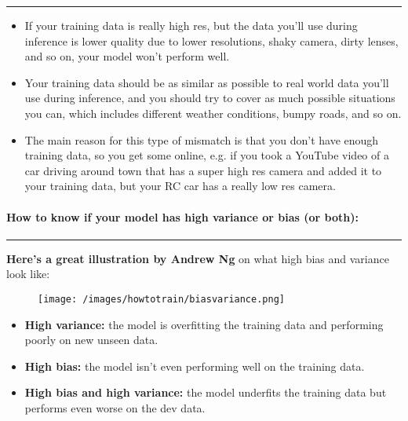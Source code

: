 \documentclass[
]{article}
\begin{document}
\begin{center}\rule{0.5\linewidth}{0.5pt}\end{center}

\begin{itemize}
\item
  If your training data is really high res, but the data you'll use
  during inference is lower quality due to lower resolutions, shaky
  camera, dirty lenses, and so on, your model won't perform well.
\item
  Your training data should be as similar as possible to real world data
  you'll use during inference, and you should try to cover as much
  possible situations you can, which includes different weather
  conditions, bumpy roads, and so on.
\item
  The main reason for this type of mismatch is that you don't have
  enough training data, so you get some online, e.g. if you took a
  YouTube video of a car driving around town that has a super high res
  camera and added it to your training data, but your RC car has a
  really low res camera.
\end{itemize}

\hypertarget{header-n36}{%
\paragraph{\texorpdfstring{\textbf{How to know if your model has high
variance or bias (or
both):}}{How to know if your model has high variance or bias (or both):}}\label{header-n36}}

\begin{center}\rule{0.5\linewidth}{0.5pt}\end{center}

\textbf{Here's a great illustration by Andrew Ng} on what high bias and
variance look like:

\begin{figure}
\centering
\texttt{[image: /images/howtotrain/biasvariance.png]}
\caption{}
\end{figure}

\begin{itemize}
\item
  \textbf{High variance:} the model is overfitting the training data and
  performing poorly on new unseen data.
\item
  \textbf{High bias:} the model isn't even performing well on the
  training data.
\item
  \textbf{High bias and high variance:} the model underfits the training
  data but performs even worse on the dev data.
\end{itemize}
\end{document}

